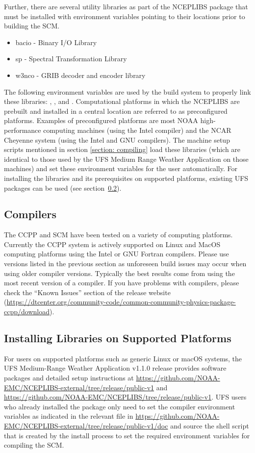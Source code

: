 Further, there are several utility libraries as part of the NCEPLIBS package that must be installed with environment variables pointing to their locations prior to building the SCM.
\begin{itemize}
    \item bacio - Binary I/O Library
    \item sp - Spectral Transformation Library
    \item w3nco - GRIB decoder and encoder library
\end{itemize}
The following environment variables are used by the build system to properly link these libraries: , , and . Computational platforms in which the NCEPLIBS are prebuilt and installed in a central location are referred to as preconfigured platforms. Examples of preconfigured platforms are most NOAA high-performance computing machines (using the Intel compiler) and the NCAR Cheyenne system (using the Intel and GNU compilers). The machine setup scripts mentioned in section \ref{section: compiling} load these libraries (which are identical to those used by the UFS Medium Range Weather Application on those machines) and set these environment variables for the user automatically. For installing the libraries and its prerequisites on supported platforms, existing UFS packages can be used (see section~\ref{section: setup_supported_platforms}).

\subsection{Compilers}
The CCPP and SCM have been tested on a variety of
computing platforms. Currently the CCPP system is actively supported
on Linux and MacOS computing platforms using the Intel or GNU Fortran
compilers. Please use versions listed in the previous section as unforeseen
build issues may occur when using older compiler versions. Typically the best results come from using the
most recent version of a compiler. If you have problems with compilers, please check the ``Known Issues'' section of the
release website (\url{https://dtcenter.org/community-code/common-community-physics-package-ccpp/download}).

\subsection{Installing Libraries on Supported Platforms}\label{section: setup_supported_platforms}
For users on supported platforms such as generic Linux or macOS systems, the UFS Medium-Range Weather Application v1.1.0 release provides software packages and detailed setup instructions at \url{https://github.com/NOAA-EMC/NCEPLIBS-external/tree/release/public-v1} and \url{https://github.com/NOAA-EMC/NCEPLIBS/tree/release/public-v1}. UFS users who already installed the  package only need to set the compiler environment variables as indicated in the relevant  file in \url{https://github.com/NOAA-EMC/NCEPLIBS-external/tree/release/public-v1/doc} and source the shell script that is created by the  install process to set the required environment variables for compiling the SCM.

